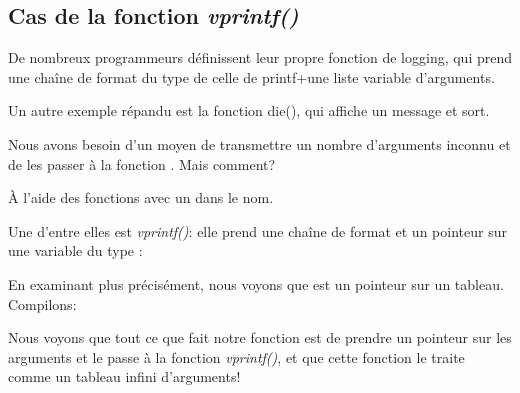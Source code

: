 \subsection{Cas de la fonction \emph{vprintf()}}

De nombreux programmeurs définissent leur propre fonction de logging, qui prend une
chaîne de format du type de celle de printf+une liste variable d'arguments.

Un autre exemple répandu est la fonction die(), qui affiche un message et sort.

Nous avons besoin d'un moyen de transmettre un nombre d'arguments inconnu et de les
passer à la fonction \printf.
Mais comment?

À l'aide des fonctions avec un  dans le nom.

Une d'entre elles est \emph{vprintf()}: elle prend une chaîne de format et un pointeur
sur une variable du type :



En examinant plus précisément, nous voyons que  est un pointeur sur
un tableau.
Compilons:



Nous voyons que tout ce que fait notre fonction est de prendre un pointeur sur les
arguments et le passe à la fonction \emph{vprintf()}, et que cette fonction le traite
comme un tableau infini d'arguments!


